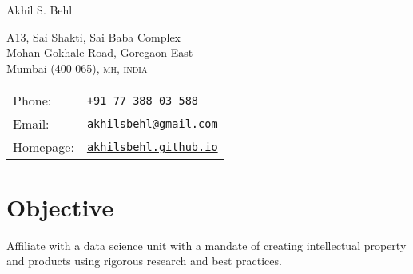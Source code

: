 \documentclass[a4paper,11pt]{article}
\def\name{Akhil S. Behl}
\newcommand{\abbrv}[1]{\textsc{#1}}
\begin{document}
{\huge \name}


\vspace{0.25in}

\begin{minipage}{0.45\linewidth}
  A13, Sai Shakti, Sai Baba Complex \\
  Mohan Gokhale Road, Goregaon East \\
  Mumbai (400 065), \abbrv{mh, india} \\
\end{minipage}
\hspace*{0.8in}
\begin{minipage}{0.45\linewidth}
  \vspace*{-\baselineskip}
  \begin{tabular}{ll}
    Phone: & \tt +91 77 388 03 588 \\
    Email: & \href{mailto:akhilsbehl@gmail.com}{\tt akhilsbehl@gmail.com} \\
    Homepage: & \href{http://akhilsbehl.github.io}{\tt akhilsbehl.github.io} \\
  \end{tabular}
\end{minipage}

\section*{Objective}
Affiliate with a data science unit with a mandate of creating intellectual
property and products using rigorous research and best practices.
\end{document}
